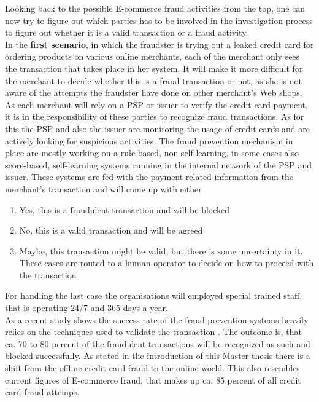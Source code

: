 Looking back to the possible E-commerce fraud activities from the top, one can now try to figure out which parties has to be involved in the investigation process to figure out whether it is a valid transaction or a fraud activity. \\

In the \textbf{first scenario}, in which the fraudster is trying out a leaked credit card for ordering products on various online merchants, each of the merchant only sees the transaction that takes place in her system. It will make it more difficult for the merchant to decide whether this is a fraud transaction or not, as she is not aware of the attempts the fraudster have done on other merchant's Web shops. As each merchant will rely on a \gls{PSP} or issuer to verify the credit card payment, it is in the responsibility of these parties to recognize fraud transactions. As for this the \gls{PSP} and also the issuer are monitoring the usage of credit cards and are actively looking for suspicious activities. The fraud prevention mechanism in place are mostly working on a rule-based, non self-learning, in some cases also score-based, self-learning systems running in the internal network of the \gls{PSP} and issuer. These systems are fed with the payment-related information from the merchant's transaction and will come up with either\@

\begin{enumerate}
  \item Yes, this is a fraudulent transaction and will be blocked
  \item No, this is a valid transaction and will be agreed
  \item Maybe, this transaction might be valid, but there is some uncertainty in it. These cases are routed to a human operator to decide on how to proceed with the transaction
\end{enumerate}

For handling the last case the organisations will employed special trained staff, that is operating 24/7 and 365 days a year. \\

As a recent study shows the success rate of the fraud prevention systems heavily relies on the techniques used to validate the transaction \citep{rana2015survey}. The outcome is, that ca. 70 to 80 percent of the fraudulent transactions will be recognized as such and blocked successfully. As stated in the introduction of this Master thesis there is a shift from the offline credit card fraud to the online world. This also resembles current figures of E-commerce fraud, that makes up ca. 85 percent of all credit card fraud attemps. \\

